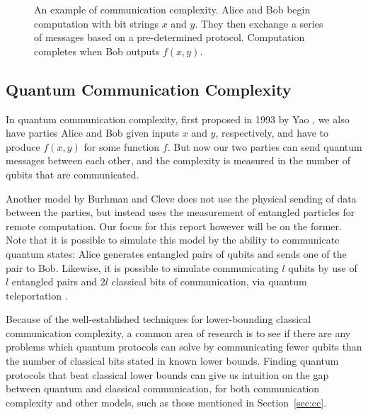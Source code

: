 \documentclass[a4paper]{article}
\begin{document}
        \begin{figure}
            \centering
            \caption{An example of communication complexity. Alice and Bob begin computation with bit strings $x$ and $y$. They then exchange a series of messages based on a pre-determined protocol. Computation completes when Bob outputs $f(x, y)$.}
            \label{fig:cc}
        \end{figure}

        \subsection{Quantum Communication Complexity}

        In quantum communication complexity, first proposed in 1993 by Yao \cite{366852}, we also have parties Alice and Bob given inputs $x$ and $y$, respectively, and have to produce $f(x, y)$ for some function $f$. But now our two parties can send quantum messages between each other, and the complexity is measured in the number of qubits that are communicated.

        Another model by Burhman and Cleve \cite{quant-ph/9704026} does not use the physical sending of data between the parties, but instead uses the measurement of entangled particles for remote computation. Our focus for this report however will be on the former. Note that it is possible to simulate this model by the ability to communicate quantum states: Alice generates entangled pairs of qubits and sends one of the pair to Bob. Likewise, it is possible to simulate communicating $l$ qubits by use of $l$ entangled pairs and $2l$ classical bits of communication, via quantum teleportation \cite{PhysRevLett.70.1895}.

        Because of the well-established techniques for lower-bounding classical communication complexity, a common area of research is to see if there are any problems which quantum protocols can solve by communicating fewer qubits than the number of classical bits stated in known lower bounds. Finding quantum protocols that beat classical lower bounds can give us intuition on the gap between quantum and classical communication, for both communication complexity and other models, such as those mentioned in Section~\ref{sec:cc}.
\end{document}
